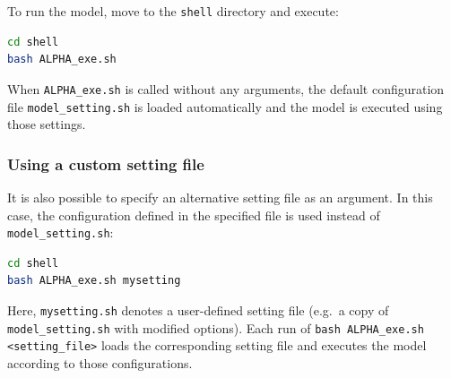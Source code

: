 To run the model, move to the \texttt{shell} directory and execute:

\begin{lstlisting}[language=bash]
cd shell
bash ALPHA_exe.sh
\end{lstlisting}

When \texttt{ALPHA\_exe.sh} is called without any arguments, 
the default configuration file \texttt{model\_setting.sh} is loaded automatically 
and the model is executed using those settings.

\subsubsection*{Using a custom setting file}

It is also possible to specify an alternative setting file as an argument.  
In this case, the configuration defined in the specified file is used instead of 
\texttt{model\_setting.sh}:

\begin{lstlisting}[language=bash]
cd shell
bash ALPHA_exe.sh mysetting
\end{lstlisting}

Here, \texttt{mysetting.sh} denotes a user-defined setting file 
(e.g.\ a copy of \texttt{model\_setting.sh} with modified options).  
Each run of \texttt{bash ALPHA\_exe.sh <setting\_file>} loads the corresponding setting file 
and executes the model according to those configurations.


